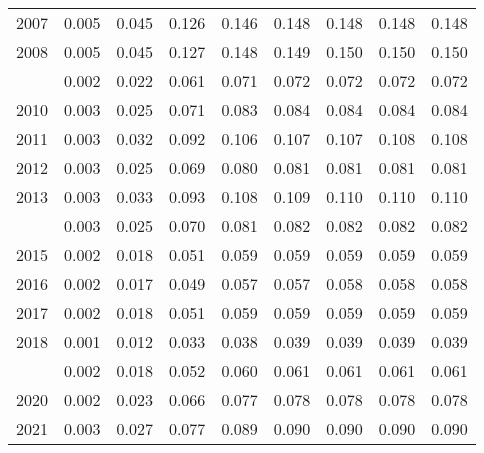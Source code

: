 \documentclass[
]{article}
\begin{document}
\begin{longtable}[t]{lrrrrrrrr}
2007 & 0.005 & 0.045 & 0.126 & 0.146 & 0.148 & 0.148 & 0.148 & 0.148\\
2008 & 0.005 & 0.045 & 0.127 & 0.148 & 0.149 & 0.150 & 0.150 & 0.150\\
\addlinespace
2009 & 0.002 & 0.022 & 0.061 & 0.071 & 0.072 & 0.072 & 0.072 & 0.072\\
2010 & 0.003 & 0.025 & 0.071 & 0.083 & 0.084 & 0.084 & 0.084 & 0.084\\
2011 & 0.003 & 0.032 & 0.092 & 0.106 & 0.107 & 0.107 & 0.108 & 0.108\\
2012 & 0.003 & 0.025 & 0.069 & 0.080 & 0.081 & 0.081 & 0.081 & 0.081\\
2013 & 0.003 & 0.033 & 0.093 & 0.108 & 0.109 & 0.110 & 0.110 & 0.110\\
\addlinespace
2014 & 0.003 & 0.025 & 0.070 & 0.081 & 0.082 & 0.082 & 0.082 & 0.082\\
2015 & 0.002 & 0.018 & 0.051 & 0.059 & 0.059 & 0.059 & 0.059 & 0.059\\
2016 & 0.002 & 0.017 & 0.049 & 0.057 & 0.057 & 0.058 & 0.058 & 0.058\\
2017 & 0.002 & 0.018 & 0.051 & 0.059 & 0.059 & 0.059 & 0.059 & 0.059\\
2018 & 0.001 & 0.012 & 0.033 & 0.038 & 0.039 & 0.039 & 0.039 & 0.039\\
\addlinespace
2019 & 0.002 & 0.018 & 0.052 & 0.060 & 0.061 & 0.061 & 0.061 & 0.061\\
2020 & 0.002 & 0.023 & 0.066 & 0.077 & 0.078 & 0.078 & 0.078 & 0.078\\
2021 & 0.003 & 0.027 & 0.077 & 0.089 & 0.090 & 0.090 & 0.090 & 0.090\\*
\end{longtable}
\end{document}
